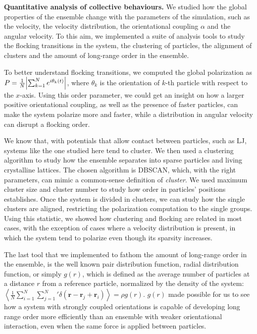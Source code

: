 \documentclass[a4paper, notitlepage]{report} %
\begin{document}
	\textbf{Quantitative analysis of collective behaviours.}
	We studied how the global properties of the ensemble change with the parameters of the simulation, such as the velocity, the velocity distribution, the orientational coupling $\alpha$ and the angular velocity.
	To this aim, we implemented a suite of analysis tools to study the flocking transitions in the system, the clustering of particles, the alignment of clusters and the amount of long-range order in the ensemble.

	To better understand flocking transitions, we computed the global polarization as $P = \frac{1}{N} \abs{\sum_{k=1}^{N} e^{i \theta_k(t)}}$, where $\theta_k$ is the orientation of $k$-th particle with respect to the $x$-axis.
	Using this order parameter, we could get an insight on how a larger positive orientational coupling, as well as the presence of faster particles, can make the system polarize more and faster, while a distribution in angular velocity can disrupt a flocking order. %

	We know that, with potentials that allow contact between particles, such as LJ, systems like the one studied here tend to cluster.
	We then used a clustering algorithm to study how the ensemble separates into sparse particles and living crystalline lattices.
	The chosen algorithm is DBSCAN, which, with the right parameters, can mimic a common-sense definition of \emph{cluster}.
	We used maximum cluster size and cluster number to study how order in particles' positions establishes.
	Once the system is divided in clusters, we can study how the single clusters are aligned, restricting the polarization computation to the single groups.
	Using this statistic, we showed how clustering and flocking are related in most cases, with the exception of cases where a velocity distribution is present, in which the system tend to polarize even though its sparsity increases.

	The last tool that we implemented to fathom the amount of long-range order in the ensemble, is the well known pair distribution function, radial distribution function, or simply $g(r)$, which is defined \cite{hansen90a} as the average number of particles at a distance $r$ from a reference particle, normalized by the density of the system:
	$\left\langle \frac{1}{N} \sum_{i=1}^{N} \sum_{j=1}^{N}{}' \delta (\mathbf{r} - \mathbf{r}_j + \mathbf{r}_i) \right\rangle = \rho g(r)$.
	$g(r)$ made possible for us to see how a system with strongly coupled orientations is capable of developing long range order more efficiently than an ensemble with weaker orientational interaction, even when the same force is applied between particles. 
	
\end{document}
